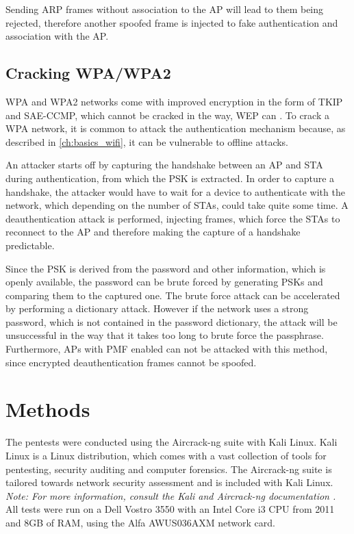 Sending ARP frames without association to the AP will lead to them being rejected, therefore another spoofed frame is injected to fake authentication and association with the AP.

\subsection{Cracking WPA/WPA2}
WPA and WPA2 networks come with improved encryption in the form of TKIP and SAE-CCMP, which cannot be cracked in the way, WEP can \cite{Oriyano_2017}.
To crack a WPA network, it is common to attack the authentication mechanism because, as described in \cref{ch:basics_wifi}, it can be vulnerable to offline attacks.

An attacker starts off by capturing the handshake between an AP and STA during authentication, from which the PSK is extracted.
In order to capture a handshake, the attacker would have to wait for a device to authenticate with the network, which depending on the number of STAs, could take quite some time.
A deauthentication attack is performed, injecting frames, which force the STAs to reconnect to the AP and therefore making the capture of a handshake predictable.

Since the PSK is derived from the password and other information, which is openly available, the password can be brute forced by generating PSKs and comparing them to the captured one.
The brute force attack can be accelerated by performing a dictionary attack.
However if the network uses a strong password, which is not contained in the password dictionary, the attack will be unsuccessful in the way that it takes too long to brute force the passphrase.
Furthermore, APs with PMF enabled can not be attacked with this method, since encrypted deauthentication frames cannot be spoofed.

\section{Methods}\label{sec:testing_methods}
The pentests were conducted using the Aircrack-ng suite with Kali Linux.
Kali Linux is a Linux distribution, which comes with a vast collection of tools for pentesting, security auditing and computer forensics.
The Aircrack-ng suite is tailored towards network security assessment and is included with Kali Linux.
\\\textit{Note: For more information, consult the Kali and Aircrack-ng documentation \cite{aircrack_ng}\cite{kali_docs}.}
\\All tests were run on a Dell Vostro 3550 with an Intel Core i3 CPU from 2011 and 8GB of RAM, using the Alfa AWUS036AXM network card.

